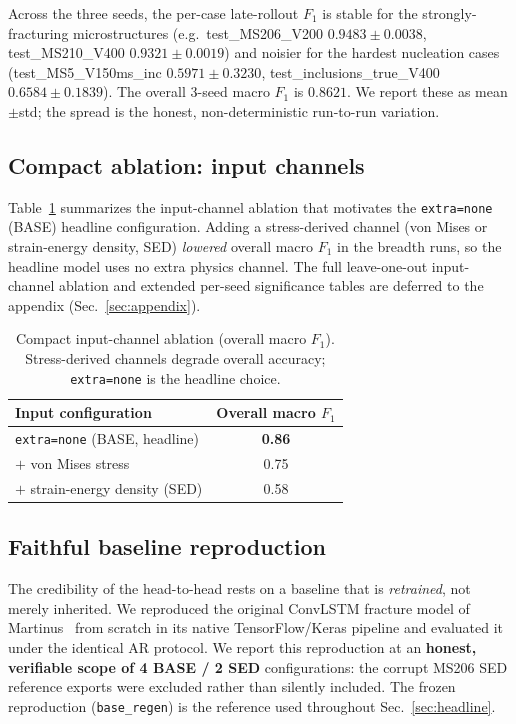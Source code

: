 \documentclass[11pt]{article}
\begin{document}
Across the three seeds, the per-case late-rollout $F_1$ is stable for the
strongly-fracturing microstructures (e.g.\ test\_MS206\_V200 $0.9483\pm0.0038$,
test\_MS210\_V400 $0.9321\pm0.0019$) and noisier for the hardest nucleation cases
(test\_MS5\_V150ms\_inc $0.5971\pm0.3230$, test\_inclusions\_true\_V400
$0.6584\pm0.1839$). The overall 3-seed macro $F_1$ is $0.8621$. We report these
as mean$\pm$std; the spread is the honest, non-deterministic run-to-run variation.

\subsection{Compact ablation: input channels}
\label{sec:ablation}

Table~\ref{tab:ablation} summarizes the input-channel ablation that motivates the
\texttt{extra=none} (BASE) headline configuration. Adding a stress-derived channel
(von Mises or strain-energy density, SED) \emph{lowered} overall macro $F_1$ in
the breadth runs, so the headline model uses no extra physics channel. The full
leave-one-out input-channel ablation and extended per-seed significance tables are
deferred to the appendix (Sec.~\ref{sec:appendix}).

\begin{table}[t]
\centering
\caption{Compact input-channel ablation (overall macro $F_1$). Stress-derived
channels degrade overall accuracy; \texttt{extra=none} is the headline choice.}
\label{tab:ablation}
\small
\begin{tabular}{lc}
\toprule
Input configuration & Overall macro $F_1$ \\
\midrule
\texttt{extra=none} (BASE, headline) & \textbf{0.86} \\
$+$ von Mises stress                 & 0.75 \\
$+$ strain-energy density (SED)      & 0.58 \\
\bottomrule
\end{tabular}
\end{table}

\subsection{Faithful baseline reproduction}
\label{sec:repro-baseline}

The credibility of the head-to-head rests on a baseline that is \emph{retrained},
not merely inherited. We reproduced the original ConvLSTM fracture model of
Martinus~\citep{martinus2024thesis} from scratch in its native TensorFlow/Keras
pipeline and evaluated it under the identical AR protocol. We report this reproduction at an \textbf{honest, verifiable scope of
4 BASE / 2 SED} configurations: the corrupt MS206 SED reference exports were
excluded rather than silently included. The frozen reproduction
(\texttt{base\_regen}) is the reference used throughout Sec.~\ref{sec:headline}.
\end{document}

